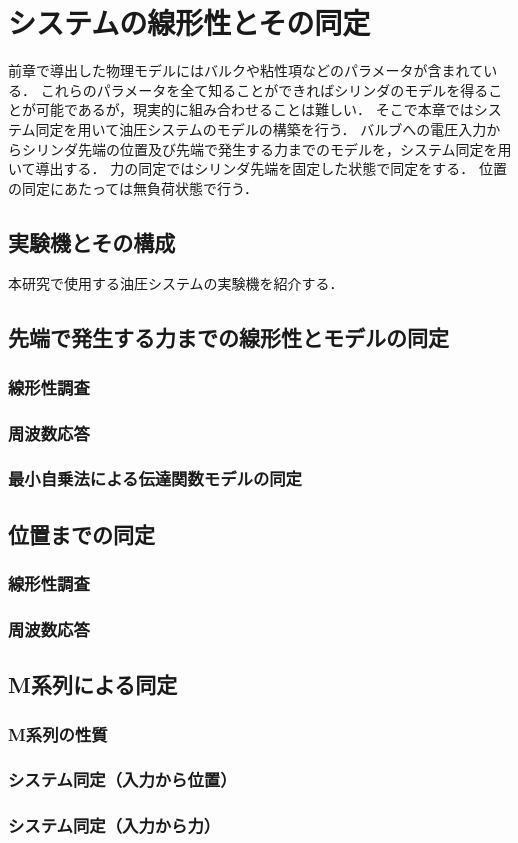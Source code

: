 \chapter{システムの線形性とその同定}
前章で導出した物理モデルにはバルクや粘性項などのパラメータが含まれている．
これらのパラメータを全て知ることができればシリンダのモデルを得ることが可能であるが，現実的に組み合わせることは難しい．
そこで本章ではシステム同定を用いて油圧システムのモデルの構築を行う．
バルブへの電圧入力からシリンダ先端の位置及び先端で発生する力までのモデルを，システム同定を用いて導出する．
力の同定ではシリンダ先端を固定した状態で同定をする．
位置の同定にあたっては無負荷状態で行う．
\section{実験機とその構成}
本研究で使用する油圧システムの実験機を紹介する．
\section{先端で発生する力までの線形性とモデルの同定}
\subsection{線形性調査}
\subsection{周波数応答}
\subsection{最小自乗法による伝達関数モデルの同定}
\section{位置までの同定}
\subsection{線形性調査}
\subsection{周波数応答}
\section{M系列による同定}
\subsection{M系列の性質}
\subsection{システム同定（入力から位置）}
\subsection{システム同定（入力から力）}

